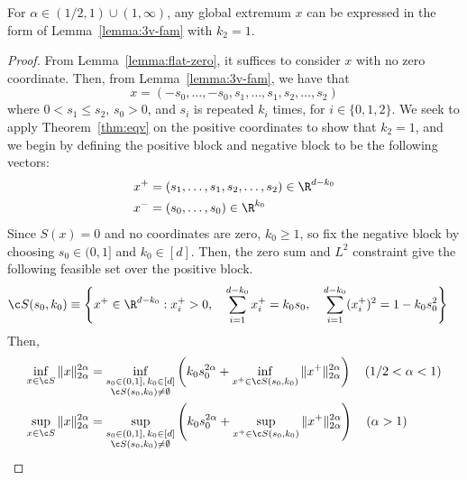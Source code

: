 \documentclass[11pt]{article}
\begin{document}
\begin{lemma}\label{lemma:k2=1}
For $\alpha \in (1/2,1)\cup(1,\infty)$, any global extremum $x$ can be expressed in the form of Lemma~\ref{lemma:3v-fam} with $k_2= 1$.
\end{lemma}
\begin{proof}
    From Lemma~\ref{lemma:flat-zero}, it suffices to consider $x$ with no zero coordinate. Then, from Lemma~\ref{lemma:3v-fam}, we have that 
    $$x=(-s_0,\dots,-s_0,s_1,\dots,s_1,s_2,\dots,s_2)$$
    where $0< s_1\leq s_2$, $s_0>0 $, and $s_i$ is repeated $k_i$ times, for $i\in \{0,1,2\}$. We seek to apply Theorem~\ref{thm:eqv} on the positive coordinates to show that $k_2=1$, and we begin by defining the positive block and negative block to be the following vectors:
    \begin{align*}
    x^+&=(s_1,\dots,s_1,s_2,\dots,s_2)\in \R^{d-k_0}\\
    x^-&=(s_0,\dots,s_0)\in \R^{k_0}
    \end{align*}
    Since $S(x)=0$ and no coordinates are zero, $k_0\geq 1$, so fix the negative block by choosing $s_0\in (0,1]$ and $k_0\in [d] $. 
    Then, the zero sum and $L^2$ constraint give the following feasible set over the positive block.
    \begin{align*}
        {\c S}(s_0,k_0)&\equiv \left\{x^+\in \R^{d-k_0}:x^+_i> 0,\quad 
        \sum_{i=1}^{d-k_0}x^+_i=k_0s_0,\quad \sum_{i=1}^{d-k_0}(x^+_i)^2=1-k_0s_0^2\right\}
    \end{align*}
    Then,  
    \begin{align*}
        \inf_{x\in {\c S}}\|x\|_{2\alpha}^{2\alpha}&=\inf_{\substack{
s_0\in(0,1],\,
k_0\in [d]\\
{\c S}(s_0,k_0)\neq\emptyset
}}\left(k_0s_0^{2\alpha}+\inf_{x^+\in {\c S}(s_0,k_0)}\|x^+\|^{2\alpha}_{2\alpha}\right)\quad (1/2<\alpha<1)\\ 
        \sup_{x\in {\c S}}\|x\|_{2\alpha}^{2\alpha}&=\sup_{\substack{
s_0\in(0,1],\,
k_0\in [d]\\
{\c S}(s_0,k_0)\neq\emptyset
}}\left(k_0s_0^{2\alpha}+\sup_{x^+\in {\c S}(s_0,k_0)}\|x^+\|^{2\alpha}_{2\alpha}\right)\quad (\alpha > 1)
    \end{align*}


\end{proof}
\end{document}
